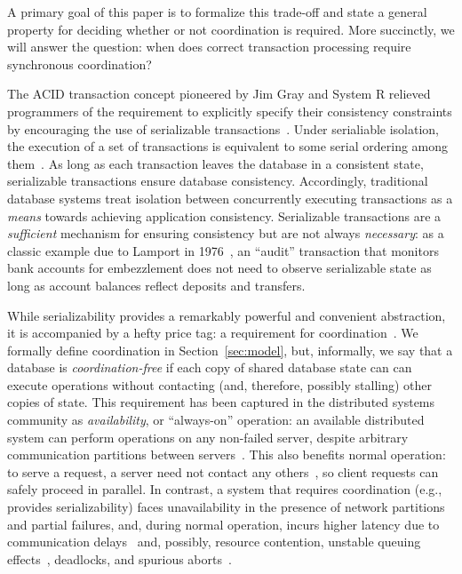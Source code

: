A primary goal of this paper is to formalize this trade-off and state
a general property for deciding whether or not coordination is
required. More succinctly, we will answer the question: when does
correct transaction processing require synchronous coordination?


 The ACID transaction concept
pioneered by Jim Gray and System R relieved programmers of the
requirement to explicitly specify their consistency constraints by
encouraging the use of serializable
transactions~\cite{gray-virtues}. Under serialiable isolation, the
execution of a set of transactions is equivalent to some serial
ordering among them~\cite{bernstein-book}. As long as each transaction
leaves the database in a consistent state, serializable transactions
ensure database consistency. Accordingly, traditional database systems
treat isolation between concurrently executing transactions as a
\textit{means} towards achieving application consistency. Serializable
transactions are a \textit{sufficient} mechanism for ensuring
consistency but are not always \textit{necessary}: as a classic
example due to Lamport in
1976~\cite{lamport-audit,schneider-concurrent}, an ``audit''
transaction that monitors bank accounts for embezzlement does not need
to observe serializable state as long as account balances reflect
deposits and transfers.


 While serializability provides a
remarkably powerful and convenient abstraction, it is accompanied by a
hefty price tag: a requirement for
coordination~\cite{davidson-survey}. We formally define coordination
in Section~\ref{sec:model}, but, informally, we say that a database is
\textit{coordination-free} if each copy of shared database state can
can execute operations without contacting (and, therefore, possibly
stalling) other copies of state. This requirement has been captured in
the distributed systems community as \textit{availability}, or
``always-on'' operation: an available distributed system can perform
operations on any non-failed server, despite arbitrary communication
partitions between servers~\cite{gilbert-cap}. This also benefits
normal operation: to serve a request, a \cfree server need not contact
any others~\cite{pacelc}, so client requests can safely proceed in
parallel. In contrast, a system that requires coordination (e.g.,
provides serializability) faces unavailability in the presence of
network partitions and partial failures, and, during normal operation,
incurs higher latency due to communication delays~\cite{hat-vldb} and,
possibly, resource contention, unstable queuing effects~\cite{ladis},
deadlocks, and spurious
aborts~\cite{bernstein-book,gray-book,gray-virtues}.

